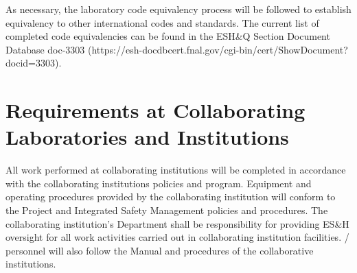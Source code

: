 As necessary, the laboratory code equivalency process will be followed
to establish equivalency to other international codes and
standards. The current list of completed code equivalencies can be
found in the ESH\&Q Section Document Database doc-3303
(https://esh-docdbcert.fnal.gov/cgi-bin/cert/ShowDocument?docid=3303).

\section{ Requirements at Collaborating Laboratories and Institutions}

All work performed at collaborating institutions will be completed in
accordance with the collaborating institutions 
policies and program. Equipment and operating procedures
provided by the collaborating institution will conform to the 
Project  and Integrated Safety Management policies and
procedures. The collaborating institution's  Department shall be
responsibility for providing ES\&H oversight for all work activities
carried out in collaborating institution facilities. /
personnel will also follow the  Manual and procedures of the
collaborative institutions.
